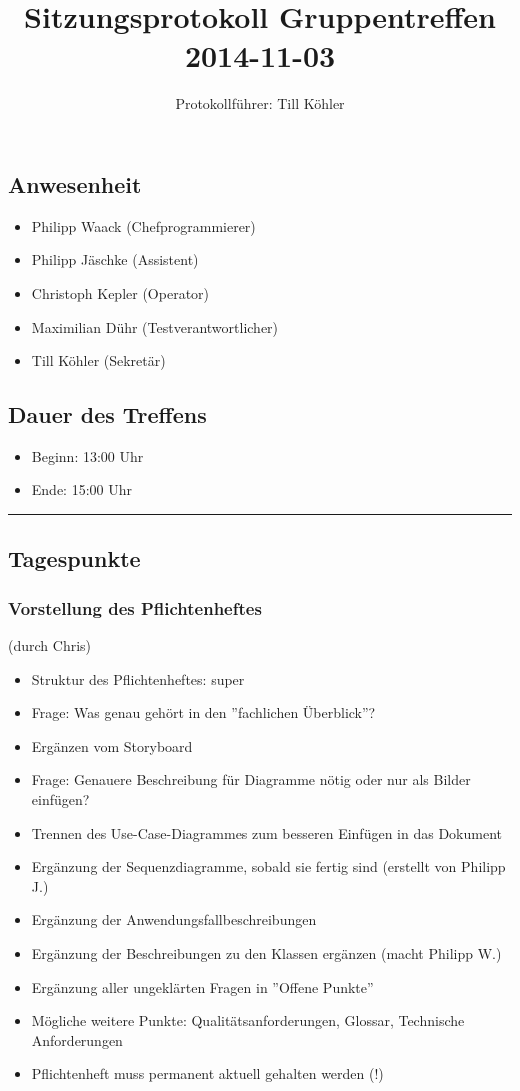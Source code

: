 \documentclass[12pt,a4paper]{article}
\author{Protokollführer: Till Köhler}
\title{Sitzungsprotokoll Gruppentreffen 2014-11-03}
\date{}
\begin{document}
\maketitle

\subsection*{Anwesenheit}
\medskip
\begin{itemize}
\item Philipp Waack (Chefprogrammierer)
\item Philipp Jäschke (Assistent)
\item Christoph Kepler (Operator)
\item Maximilian Dühr (Testverantwortlicher)
\item Till Köhler (Sekretär)
\end{itemize}

\subsection*{Dauer des Treffens}
\medskip
\begin{itemize}
\item Beginn: 13:00 Uhr
\item Ende: 15:00 Uhr
\end{itemize}

\noindent\rule{\textwidth}{1pt}

\subsection*{Tagespunkte}
\medskip

\subsubsection*{Vorstellung des Pflichtenheftes}
(durch Chris)
\begin{itemize}
\item Struktur des Pflichtenheftes: super
\item Frage: Was genau gehört in den ''fachlichen Überblick''?
\item Ergänzen vom Storyboard 
\item Frage: Genauere Beschreibung für Diagramme nötig oder nur als Bilder einfügen?
\item Trennen des Use-Case-Diagrammes zum besseren Einfügen in das Dokument
\item Ergänzung der Sequenzdiagramme, sobald sie fertig sind (erstellt von Philipp J.)
\item Ergänzung der Anwendungsfallbeschreibungen
\item Ergänzung der Beschreibungen zu den Klassen ergänzen (macht Philipp W.)
\item Ergänzung aller ungeklärten Fragen in ''Offene Punkte''
\item Mögliche weitere Punkte: Qualitätsanforderungen, Glossar, Technische Anforderungen
\item Pflichtenheft muss permanent aktuell gehalten werden (!)
\end{itemize}
\end{document}
